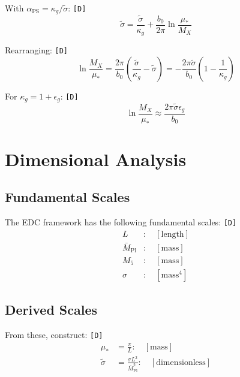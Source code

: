 \documentclass[11pt,a4paper]{article}
\newcommand{\tagD}{\textcolor{green!50!black}{\texttt{[D]}}}
\theoremstyle{definition}
\begin{document}
With $\alpha_{\text{PS}} = \kappa_g / \tilde{\sigma}$: \tagD{}
\begin{equation}
\label{eq:solution-step1}
\tilde{\sigma} = \frac{\tilde{\sigma}}{\kappa_g} + \frac{b_0}{2\pi} \ln\frac{\mu_*}{M_X}
\end{equation}

Rearranging: \tagD{}
\begin{equation}
\label{eq:solution-step2}
\ln\frac{M_X}{\mu_*} = \frac{2\pi}{b_0} \left(\frac{\tilde{\sigma}}{\kappa_g} - \tilde{\sigma}\right) = -\frac{2\pi \tilde{\sigma}}{b_0} \left(1 - \frac{1}{\kappa_g}\right)
\end{equation}

For $\kappa_g = 1 + \epsilon_g$: \tagD{}
\begin{equation}
\label{eq:solution-step3}
\ln\frac{M_X}{\mu_*} \approx \frac{2\pi \tilde{\sigma} \epsilon_g}{b_0}
\end{equation}

\section{Dimensional Analysis}
\label{app:dimensional}

\subsection{Fundamental Scales}
\label{app:fundamental-scales}

The EDC framework has the following fundamental scales: \tagD{}
\begin{align}
\label{eq:scale-L}
L &: \quad [\text{length}] \\
\label{eq:scale-Mpl}
\bar{M}_{\text{Pl}} &: \quad [\text{mass}] \\
\label{eq:scale-M5}
M_5 &: \quad [\text{mass}] \\
\label{eq:scale-sigma}
\sigma &: \quad [\text{mass}^4]
\end{align}

\subsection{Derived Scales}
\label{app:derived-scales}

From these, construct: \tagD{}
\begin{align}
\label{eq:mustar-scale}
\mu_* &= \frac{\pi}{L} : \quad [\text{mass}] \\
\label{eq:sigma-tilde-scale}
\tilde{\sigma} &= \frac{\sigma L^2}{\bar{M}_{\text{Pl}}^2} : \quad [\text{dimensionless}]
\end{align}
\end{document}
